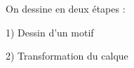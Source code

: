 \documentclass[preview]{standalone}
\begin{document}
\begin{center}
On dessine en deux étapes :

1) Dessin d'un motif

2) Transformation du calque
\end{center}
\end{document}
